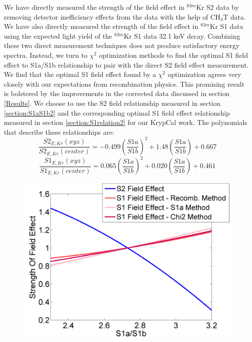 We have directly measured the strength of the field effect in $^{83m}$Kr S2 data by removing detector inefficiency effects from the data with the help of CH$_3$T data.  We have also directly measured the strength of the field effect in $^{83m}$Kr S1 data using the expected light yield of the $^{83m}$Kr S1 data 32.1 keV decay.  Combining these two direct measurement techniques does not produce satisfactory energy spectra.  Instead, we turn to $\chi^2$ optimization methods to find the optimal S1 field effect to S1a/S1b relationship to pair with the direct S2 field effect measurement.  We find that the optimal S1 field effect found by a $\chi^2$ optimization agrees very closely with our expectations from recombination physics.  This promising result is bolstered by the improvements in the corrected data discussed in section \ref{Results}. We choose to use the S2 field relationship measured in section \ref{section:S1aS1b2} and the corresponding optimal S1 field effect relationship measured in section \ref{section:S1relation2} for our KrypCal work. The polynomials that describe these relationships are:
\begin{equation}
\frac{S2_{E,Kr}(xyz)}{S2_{E,Kr}(center)} =    -0.499 \left(\frac{S1a}{S1b} \right)^2 + 1.48  \left(\frac{S1a}{S1b} \right) + 0.667
\end{equation}
\begin{equation}
\frac{S1_{E,Kr}(xyz)}{S1_{E,Kr}(center)} =   0.065 \left(\frac{S1a}{S1b} \right)^2 + 0.020 \left(\frac{S1a}{S1b} \right) + 0.461
\end{equation}


\begin{figure}[!h]
\includegraphics[scale=0.6]{Run04Corrections/StrengthOfFieldEffectOverlay.png}
 \label{AllMeasurements}
\end{figure}

